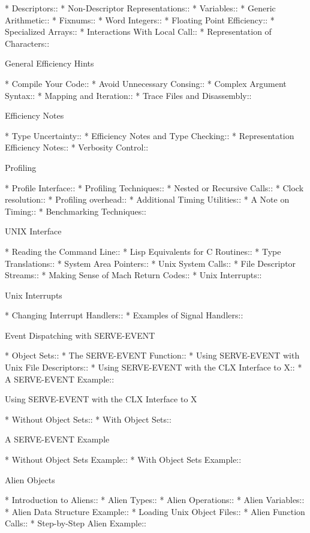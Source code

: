 \begin{menu}
* Descriptors::                 
* Non-Descriptor Representations::  
* Variables::                   
* Generic Arithmetic::          
* Fixnums::                     
* Word Integers::               
* Floating Point Efficiency::   
* Specialized Arrays::          
* Interactions With Local Call::  
* Representation of Characters::  

General Efficiency Hints

* Compile Your Code::           
* Avoid Unnecessary Consing::   
* Complex Argument Syntax::     
* Mapping and Iteration::       
* Trace Files and Disassembly::  

Efficiency Notes

* Type Uncertainty::            
* Efficiency Notes and Type Checking::  
* Representation Efficiency Notes::  
* Verbosity Control::           

Profiling

* Profile Interface::           
* Profiling Techniques::        
* Nested or Recursive Calls::   
* Clock resolution::            
* Profiling overhead::          
* Additional Timing Utilities::  
* A Note on Timing::            
* Benchmarking Techniques::     

UNIX Interface

* Reading the Command Line::    
* Lisp Equivalents for C Routines::  
* Type Translations::           
* System Area Pointers::        
* Unix System Calls::           
* File Descriptor Streams::     
* Making Sense of Mach Return Codes::  
* Unix Interrupts::             

Unix Interrupts

* Changing Interrupt Handlers::  
* Examples of Signal Handlers::  

Event Dispatching with SERVE-EVENT

* Object Sets::                 
* The SERVE-EVENT Function::    
* Using SERVE-EVENT with Unix File Descriptors::  
* Using SERVE-EVENT with the CLX Interface to X::  
* A SERVE-EVENT Example::       

Using SERVE-EVENT with the CLX Interface to X

* Without Object Sets::         
* With Object Sets::            

A SERVE-EVENT Example

* Without Object Sets Example::  
* With Object Sets Example::    

Alien Objects

* Introduction to Aliens::      
* Alien Types::                 
* Alien Operations::            
* Alien Variables::             
* Alien Data Structure Example::  
* Loading Unix Object Files::   
* Alien Function Calls::        
* Step-by-Step Alien Example::  


\end{menu}
